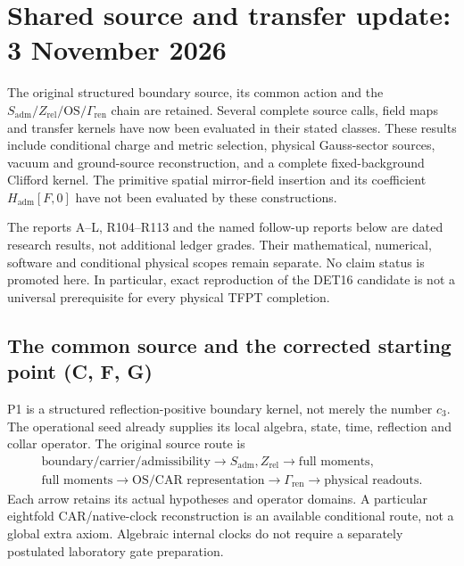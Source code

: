 \clearpage
\section*{Shared source and transfer update: 3 November 2026}
{}
\label{sec:source-completion-20261103}

\begin{keybox}
The original structured boundary source, its common action and the
$S_{\mathrm{adm}}/Z_{\mathrm{rel}}/\mathrm{OS}/\Gamma_{\mathrm{ren}}$
chain are retained. Several complete source calls, field maps and transfer
kernels have now been evaluated in their stated classes. These results
include conditional charge and metric selection, physical Gauss-sector
sources, vacuum and ground-source reconstruction, and a complete
fixed-background Clifford kernel. The primitive spatial mirror-field
insertion and its coefficient $H_{\mathrm{adm}}[F,0]$ have not been
evaluated by these constructions.

The reports A--L, R104--R113 and the named follow-up reports below
are dated research results,
not additional ledger grades. Their mathematical, numerical, software
and conditional physical scopes remain separate. No claim status is
promoted here. In particular, exact reproduction of the DET16 candidate
is not a universal prerequisite for every physical TFPT completion.
\end{keybox}

\subsection*{The common source and the corrected starting point (C, F, G)}

P1 is a structured reflection-positive boundary kernel, not merely the
number $c_3$. The operational seed already supplies its local algebra,
state, time, reflection and collar operator. The original source route is
\[
 \begin{gathered}
 \text{boundary/carrier/admissibility}
 \longrightarrow S_{\mathrm{adm}},Z_{\mathrm{rel}}
 \longrightarrow \text{full moments},\\
 \text{full moments}
 \longrightarrow \text{OS/CAR representation}
 \longrightarrow \Gamma_{\mathrm{ren}}
 \longrightarrow \text{physical readouts}.
 \end{gathered}
\]
Each arrow retains its actual hypotheses and operator domains. A
particular eightfold CAR/native-clock reconstruction is an available
conditional route, not a global extra axiom. Algebraic internal clocks
do not require a separately postulated laboratory gate preparation.


